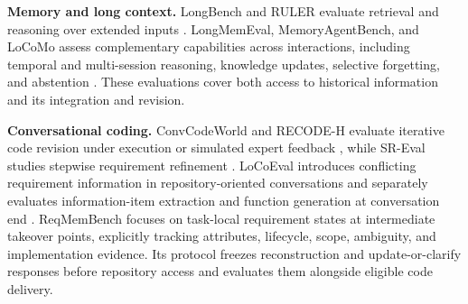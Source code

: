 \documentclass{article} %
\begin{document}
\noindent\textbf{Memory and long context.}
LongBench and RULER evaluate retrieval and reasoning over extended
inputs \citep{bai2024longbench,hsieh2024ruler}.
LongMemEval, MemoryAgentBench, and LoCoMo assess complementary
capabilities across interactions, including temporal and
multi-session reasoning, knowledge updates, selective forgetting,
and abstention
\citep{wu2025longmemeval,hu2025memoryagentbench,maharana2024locomo}.
These evaluations cover both access to historical information and
its integration and revision.

\noindent\textbf{Conversational coding.}
ConvCodeWorld and RECODE-H evaluate iterative code revision under
execution or simulated expert feedback
\citep{han2025convcodeworld,miao2026recodeh}, while SR-Eval studies
stepwise requirement refinement \citep{zhan2025sreval}.
LoCoEval introduces conflicting requirement information in
repository-oriented conversations and separately evaluates
information-item extraction and function generation at conversation
end \citep{liu2026locoeval}.
ReqMemBench focuses on task-local requirement states at intermediate
takeover points, explicitly tracking attributes, lifecycle, scope,
ambiguity, and implementation evidence. Its protocol freezes
reconstruction and update-or-clarify responses before repository
access and evaluates them alongside eligible code delivery.






\end{document}
